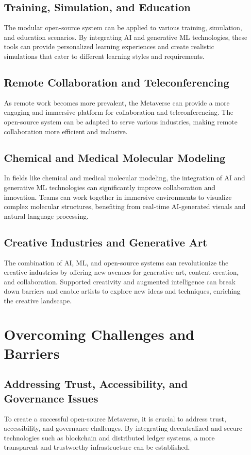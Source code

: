 \subsection{Training, Simulation, and Education}
The modular open-source system can be applied to various training, simulation, and education scenarios. By integrating AI and generative ML technologies, these tools can provide personalized learning experiences and create realistic simulations that cater to different learning styles and requirements.

\subsection{Remote Collaboration and Teleconferencing}
As remote work becomes more prevalent, the Metaverse can provide a more engaging and immersive platform for collaboration and teleconferencing. The open-source system can be adapted to serve various industries, making remote collaboration more efficient and inclusive.

\subsection{Chemical and Medical Molecular Modeling}
In fields like chemical and medical molecular modeling, the integration of AI and generative ML technologies can significantly improve collaboration and innovation. Teams can work together in immersive environments to visualize complex molecular structures, benefiting from real-time AI-generated visuals and natural language processing.

\subsection{Creative Industries and Generative Art}
The combination of AI, ML, and open-source systems can revolutionize the creative industries by offering new avenues for generative art, content creation, and collaboration. Supported creativity and augmented intelligence can break down barriers and enable artists to explore new ideas and techniques, enriching the creative landscape.

\section{Overcoming Challenges and Barriers}
\subsection{Addressing Trust, Accessibility, and Governance Issues}
To create a successful open-source Metaverse, it is crucial to address trust, accessibility, and governance challenges. By integrating decentralized and secure technologies such as blockchain and distributed ledger systems, a more transparent and trustworthy infrastructure can be established.

